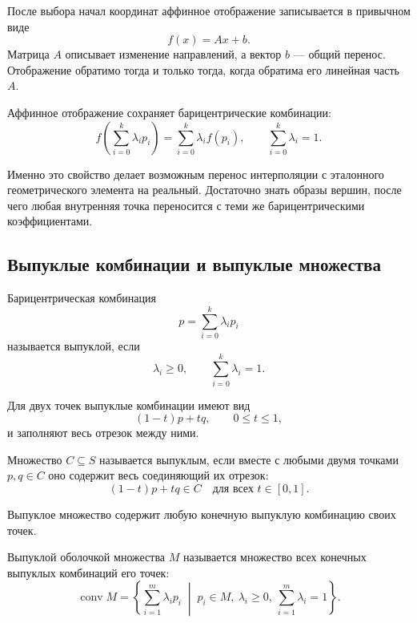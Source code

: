 После выбора начал координат аффинное отображение записывается в привычном виде
\[
f(x)=Ax+b.
\]
Матрица \(A\) описывает изменение направлений, а вектор \(b\) --- общий перенос. Отображение обратимо тогда и только тогда, когда обратима его линейная часть \(A\).

\begin{proposition}
Аффинное отображение сохраняет барицентрические комбинации:
\[
f\left(\sum_{i=0}^{k}\lambda_ip_i\right)
=
\sum_{i=0}^{k}\lambda_if(p_i),
\qquad
\sum_{i=0}^{k}\lambda_i=1.
\]
\end{proposition}

Именно это свойство делает возможным перенос интерполяции с эталонного геометрического элемента на реальный. Достаточно знать образы вершин, после чего любая внутренняя точка переносится с теми же барицентрическими коэффициентами.

\subsection{Выпуклые комбинации и выпуклые множества}

\begin{definition}
Барицентрическая комбинация
\[
p=\sum_{i=0}^{k}\lambda_ip_i
\]
называется выпуклой, если
\[
\lambda_i\geq0,
\qquad
\sum_{i=0}^{k}\lambda_i=1.
\]
\end{definition}

Для двух точек выпуклые комбинации имеют вид
\[
(1-t)p+tq,
\qquad
0\leq t\leq1,
\]
и заполняют весь отрезок между ними.

\begin{definition}
Множество \(C\subseteq S\) называется выпуклым, если вместе с любыми двумя точками \(p,q\in C\) оно содержит весь соединяющий их отрезок:
\[
(1-t)p+tq\in C
\quad
\text{для всех }t\in[0,1].
\]
\end{definition}

\begin{proposition}
Выпуклое множество содержит любую конечную выпуклую комбинацию своих точек.
\end{proposition}

\begin{definition}
Выпуклой оболочкой множества \(M\) называется множество всех конечных выпуклых комбинаций его точек:
\[
\operatorname{conv}M
=
\left\{
\sum_{i=1}^{m}\lambda_ip_i
\;\middle|\;
p_i\in M,\
\lambda_i\geq0,\
\sum_{i=1}^{m}\lambda_i=1
\right\}.
\]
\end{definition}


